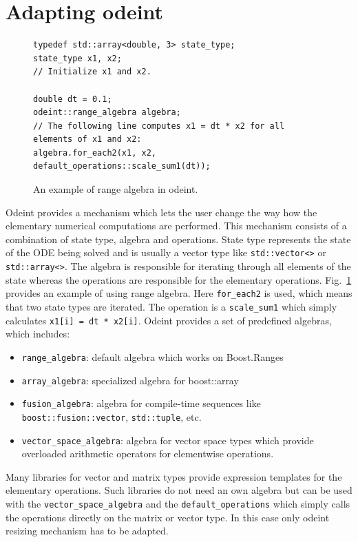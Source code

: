 \documentclass[1p]{elsarticle}
\newcommand{\code}[1]{\lstinline|#1|}
\newcommand{\figref}[1]{Fig.~\ref{#1}}
\begin{document}
%
%
\section{Adapting odeint}

\begin{figure}
\begin{lstlisting}
typedef std::array<double, 3> state_type;
state_type x1, x2;
// Initialize x1 and x2.

double dt = 0.1;
odeint::range_algebra algebra;
// The following line computes x1 = dt * x2 for all elements of x1 and x2:
algebra.for_each2(x1, x2, default_operations::scale_sum1(dt));
\end{lstlisting}
\caption{An example of range algebra in odeint.}
\label{fig:odeintops}
\end{figure}

Odeint provides a mechanism which lets the user change the way how the
elementary numerical computations are performed. This mechanism consists of a
combination of state type, algebra and operations. State type represents the
state of the ODE being solved and is usually a vector type like
\code{std::vector<>} or \code{std::array<>}. The algebra is responsible for
iterating through all elements of the state whereas the operations are
responsible for the elementary operations. \figref{fig:odeintops} provides an
example of using range algebra. Here \code{for_each2} is used, which means that
two state types are iterated. The operation is a \code{scale_sum1} which simply
calculates \code{x1[i] = dt * x2[i]}. Odeint provides a set of predefined
algebras, which includes:
\begin{itemize}
    \item \code{range_algebra}: default algebra which works on Boost.Ranges
    \item \code{array_algebra}: specialized algebra for boost::array
    \item \code{fusion_algebra}: algebra for compile-time sequences like
        \code{boost::fusion::vector}, \code{std::tuple}, etc.
    \item \code{vector_space_algebra}: algebra for vector space types which
        provide overloaded arithmetic operators for elementwise operations.
\end{itemize}

Many libraries for vector and matrix types provide expression templates for the
elementary operations. Such libraries do not need an own algebra but can be
used with the \code{vector_space_algebra} and the \code{default_operations}
which simply calls the operations directly on the matrix or vector type. In
this case only odeint resizing mechanism has to be adapted.
\end{document}
